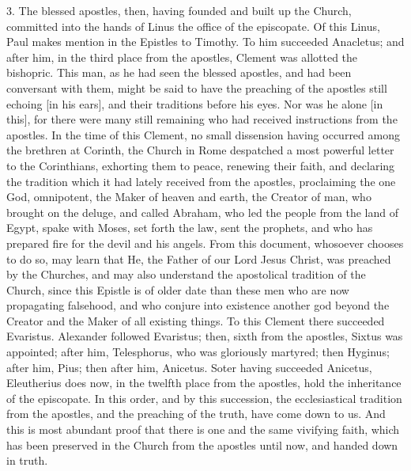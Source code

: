 3. The blessed apostles, then, having founded and built up the Church, committed into the hands of Linus the office of the episcopate. Of this Linus, Paul makes mention in the Epistles to Timothy. To him succeeded Anacletus; and after him, in the third place from the apostles, Clement was allotted the bishopric. This man, as he had seen the blessed apostles, and had been conversant with them, might be said to have the preaching of the apostles still echoing [in his ears], and their traditions before his eyes. Nor was he alone [in this], for there were many still remaining who had received instructions from the apostles. In the time of this Clement, no small dissension having occurred among the brethren at Corinth, the Church in Rome despatched a most powerful letter to the Corinthians, exhorting them to peace, renewing their faith, and declaring the tradition which it had lately received from the apostles, proclaiming the one God, omnipotent, the Maker of heaven and earth, the Creator of man, who brought on the deluge, and called Abraham, who led the people from the land of Egypt, spake with Moses, set forth the law, sent the prophets, and who has prepared fire for the devil and his angels. From this document, whosoever chooses to do so, may learn that He, the Father of our Lord Jesus Christ, was preached by the Churches, and may also understand the apostolical tradition of the Church, since this Epistle is of older date than these men who are now propagating falsehood, and who conjure into existence another god beyond the Creator and the Maker of all existing things. To this Clement there succeeded Evaristus. Alexander followed Evaristus; then, sixth from the apostles, Sixtus was appointed; after him, Telesphorus, who was gloriously martyred; then Hyginus; after him, Pius; then after him, Anicetus. Soter having succeeded Anicetus, Eleutherius does now, in the twelfth place from the apostles, hold the inheritance of the episcopate. In this order, and by this succession, the ecclesiastical tradition from the apostles, and the preaching of the truth, have come down to us. And this is most abundant proof that there is one and the same vivifying faith, which has been preserved in the Church from the apostles until now, and handed down in truth.

